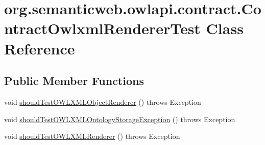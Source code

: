 \hypertarget{classorg_1_1semanticweb_1_1owlapi_1_1contract_1_1_contract_owlxml_renderer_test}{\section{org.\-semanticweb.\-owlapi.\-contract.\-Contract\-Owlxml\-Renderer\-Test Class Reference}
\label{classorg_1_1semanticweb_1_1owlapi_1_1contract_1_1_contract_owlxml_renderer_test}
}
\subsection*{Public Member Functions}
\begin{DoxyCompactItemize}
\item 
void \hyperlink{classorg_1_1semanticweb_1_1owlapi_1_1contract_1_1_contract_owlxml_renderer_test_a0f809ecc584865e715f1d9f703390954}{should\-Test\-O\-W\-L\-X\-M\-L\-Object\-Renderer} ()  throws Exception 
\item 
void \hyperlink{classorg_1_1semanticweb_1_1owlapi_1_1contract_1_1_contract_owlxml_renderer_test_a9c05b74d55d60b8073faa4c58c27e2f0}{should\-Test\-O\-W\-L\-X\-M\-L\-Ontology\-Storage\-Exception} ()  throws Exception 
\item 
void \hyperlink{classorg_1_1semanticweb_1_1owlapi_1_1contract_1_1_contract_owlxml_renderer_test_ab7eac114fa74d9a9558ff8bba2fda2c7}{should\-Test\-O\-W\-L\-X\-M\-L\-Renderer} ()  throws Exception 
\end{DoxyCompactItemize}


